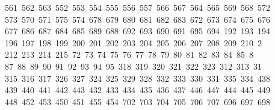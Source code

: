 \begin{tabbing}
\ 561\ 562\ 563\ 552\ 553\ 554\ 555\ 556\ 557\ 566\ 567\ 564\ 565\ 569\ 568\ 572\\[0pt]
\>\ 573\ 570\ 571\ 575\ 574\ 678\ 679\ 680\ 681\ 682\ 683\ 672\ 673\ 674\ 675\ 676\\[0pt]
\>\ 677\ 686\ 687\ 684\ 685\ 689\ 688\ 692\ 693\ 690\ 691\ 695\ 694\ 192\ 193\ 194\ \\[0pt]
\ 196\ 197\ 198\ 199\ 200\ 201\ 202\ 203\ 204\ 205\ 206\ 207\ 208\ 209\ 210\ 2\\[0pt]
\ 212\ 213\ 214\ 215\ 72\ 73\ 74\ 75\ 76\ 77\ 78\ 79\ 80\ 81\ 82\ 83\ 84\ 85\ 8\\[0pt]
\ 87\ 88\ 89\ 90\ 91\ 92\ 93\ 94\ 95\ 318\ 319\ 320\ 321\ 322\ 323\ 312\ 313\ 31\\[0pt]
\ 315\ 316\ 317\ 326\ 327\ 324\ 325\ 329\ 328\ 332\ 333\ 330\ 331\ 335\ 334\ 438\\[0pt]
\>\ 439\ 440\ 441\ 442\ 443\ 432\ 433\ 434\ 435\ 436\ 437\ 446\ 447\ 444\ 445\ 449\\[0pt]
\>\ 448\ 452\ 453\ 450\ 451\ 455\ 454\ 702\ 703\ 704\ 705\ 706\ 707\ 696\ 697\ 698\ \\[0pt]

\end{tabbing}
